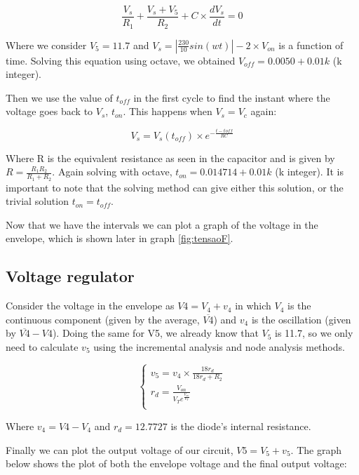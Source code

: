 \begin{equation}\label{eq:t_off}
\frac{V_s}{R_1}+\frac{V_s+V_5}{R_2}+C\times\frac{dV_s}{dt}=0
\end{equation}

Where we consider $V_5=11.7$ and $V_s=|\frac{230}{10} sin(wt)|-2\times V_{on}$ is a function of time. Solving this equation using octave, we obtained $V_{off}=0.0050 + 0.01k$ (k integer).
\par
Then we use the value of $t_{off}$ in the first cycle to find the instant where the voltage goes back to $V_s$, $t_{on}$. This happens when $V_s=V_c$ again:

\begin{equation}\label{eq:t_on}
V_s=V_s(t_{off})\times e^{-\frac{t-t{off}}{RC}}
\end{equation}

Where R is the equivalent resistance as seen in the capacitor and is given by $R=\frac{R_1 R_2}{R_1 + R_2}$. Again solving with octave, $t_{on}=0.014714 + 0.01k$ (k integer). It is important to note that the solving method can give either this solution, or the trivial solution $t_{on}=t_{off}$.
\par
Now that we have the intervals we can plot a graph of the voltage in the envelope, which is shown later in graph \ref{fig:tensaoF}.

\subsection{Voltage regulator}
Consider the voltage in the envelope as $V4=V_4 + v_4$ in which $V_4$ is the continuous component (given by the average, $\overline{V4}$) and $v_4$ is the oscillation (given by $\overline{V4} - V4$).
Doing the same for V5, we already know that $V_5$ is 11.7, so we only need to calculate $v_5$ using the incremental analysis and node analysis methods.

\begin{equation}\label{eq:v_2}
\begin{cases}
v_5=v_4\times \frac{18 r_d}{18 r_d + R_2} \\
r_d=\frac{V_{on}}{V_T e^{\frac{V_{on}}{V_T}}}\\
\end{cases}
\end{equation}

Where $v_4= V4 - V_4$ and $r_d=12.7727$ is the diode's internal resistance.
\par
Finally we can plot the output voltage of our circuit, $V5=V_5 + v_5$. The graph below shows the plot of both the envelope voltage and the final output voltage:

